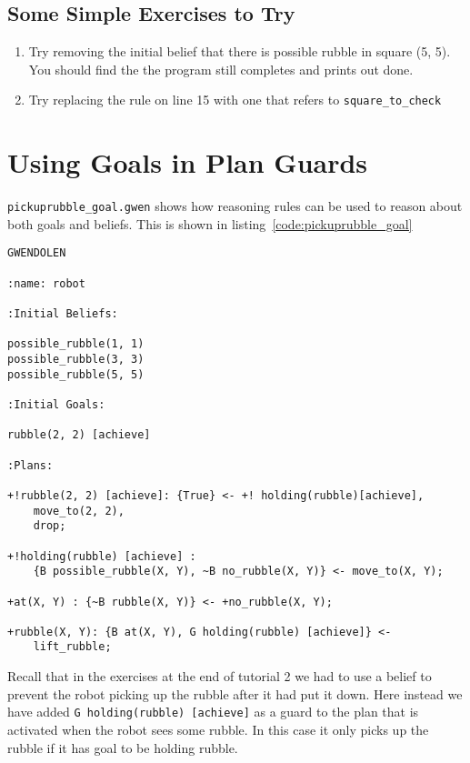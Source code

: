 \documentclass[a4]{article}
\begin{document}
\subsection{Some Simple Exercises to Try}
\begin{enumerate}
\item Try removing the initial belief that there is possible rubble in square (5, 5).  You should find the the program still completes and prints out done.
\item Try replacing the rule on line 15 with one that refers to \lstinline{square_to_check}
\end{enumerate}

\section{Using Goals in Plan Guards}

\texttt{pickuprubble\_goal.gwen} shows how reasoning rules can be used to reason about both goals and beliefs.  This is shown in listing~\ref{code:pickuprubble_goal}
\begin{lstlisting}[float,caption=Pick Up Rubble (Goals in Guards),basicstyle=\sffamily,style=easslisting,language=Gwendolen,label=code:pickuprubble_goal]
GWENDOLEN

:name: robot

:Initial Beliefs:

possible_rubble(1, 1)
possible_rubble(3, 3)
possible_rubble(5, 5)

:Initial Goals:

rubble(2, 2) [achieve]

:Plans:

+!rubble(2, 2) [achieve]: {True} <- +! holding(rubble)[achieve],
    move_to(2, 2), 
    drop;

+!holding(rubble) [achieve] : 
    {B possible_rubble(X, Y), ~B no_rubble(X, Y)} <- move_to(X, Y);

+at(X, Y) : {~B rubble(X, Y)} <- +no_rubble(X, Y);

+rubble(X, Y): {B at(X, Y), G holding(rubble) [achieve]} <- 
    lift_rubble;
\end{lstlisting}
Recall that in the exercises at the end of tutorial 2 we had to use a belief to prevent the robot picking up the rubble after it had put it down.  Here instead we have added \lstinline{G holding(rubble) [achieve]} as a guard to the plan that is activated when the robot sees some rubble.  In this case it only picks up the rubble if it has goal to be holding rubble.
\end{document}
